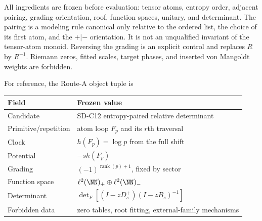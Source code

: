 All ingredients are frozen before evaluation: tensor atoms, entropy order,
adjacent pairing, grading orientation, roof, function spaces, unitary, and
determinant.  The pairing is a modeling rule canonical only relative to the
ordered list, the choice of its first atom, and the $+|-$ orientation.  It is
not an unqualified invariant of the tensor-atom monoid.  Reversing the grading
is an explicit control and replaces $R$ by $R^{-1}$.  Riemann zeros, fitted
scales, target phases, and inserted von Mangoldt weights are forbidden.

For reference, the Route-A object tuple is
\begin{center}\small
\begin{tabularx}{0.96\textwidth}{L{0.21\textwidth}X}
\toprule
Field & Frozen value\\\midrule
Candidate & SD-C12 entropy-paired relative determinant\\
Primitive/repetition & atom loop $F_p$ and its $r$th traversal\\
Clock & $h(F_p)=\log p$ from the full shift\\
Potential & $-s h(F_p)$\\
Grading & $(-1)^{\operatorname{rank}(p)+1}$, fixed by sector\\
Function space & $\ell^2(\NN)_+\oplus\ell^2(\NN)_-$\\
Determinant & $\det_F[(I-zD_s^+)(I-zB_s)^{-1}]$\\
Forbidden data & zero tables, root fitting, external-family mechanisms\\
\bottomrule
\end{tabularx}
\end{center}
